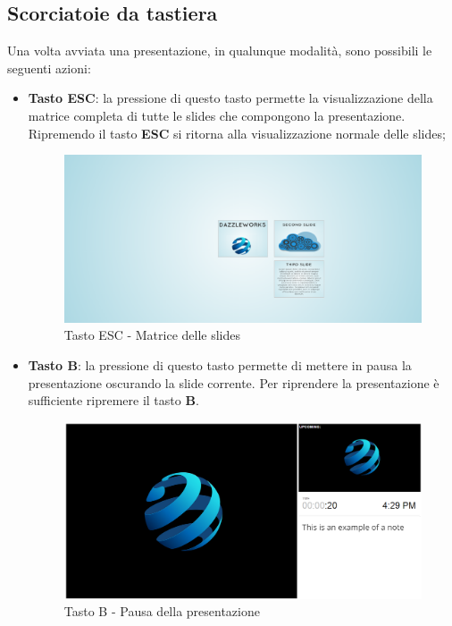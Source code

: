 \subsection{Scorciatoie da tastiera}
\noindent Una volta avviata una presentazione, in qualunque modalità, sono possibili le seguenti azioni:
\begin{itemize}
	\item \textbf{Tasto ESC}: la pressione di questo tasto permette la visualizzazione della matrice completa di tutte le slides che compongono la presentazione. Ripremendo il tasto \textbf{ESC} si ritorna alla visualizzazione normale delle slides;
	\begin{figure}[H] 
		\centering 
		\includegraphics[scale=0.40] {img/anteprima.png}
		\caption{Tasto ESC - Matrice delle slides} 
	\end{figure}
	\item \textbf{Tasto B}: la pressione di questo tasto permette di mettere in pausa la presentazione oscurando la slide corrente. Per riprendere la presentazione è sufficiente ripremere il tasto \textbf{B}.
	\begin{figure}[H] 
		\centering 
		\includegraphics[scale=0.40] {img/b.png}
		\caption{Tasto B - Pausa della presentazione} 
	\end{figure}
\end{itemize}
